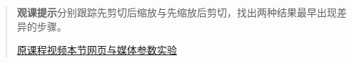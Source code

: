\begin{quote}\small\textbf{观课提示}\quad 分别跟踪先剪切后缩放与先缩放后剪切，找出两种结果最早出现差异的步骤。

\href{https://www.youtube.com/watch?v=XkY2DOUCWMU}{原课程视频}\quad\href{https://vitael04213.github.io/3blue1brown-notes/lessons/matrix-multiplication.html}{本节网页与媒体}\quad\href{https://vitael04213.github.io/3blue1brown-notes/lab.html\#compose}{参数实验}
\end{quote}
